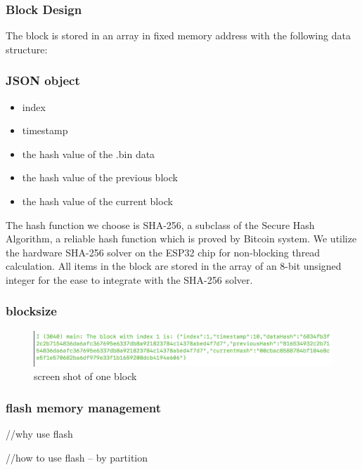 \documentclass{article}
\begin{document}
        \subsubsection{Block Design}
        The block is stored in an array in fixed memory address with the following data structure:

        \subsubsection{JSON object}

        \begin{itemize}
          \item index
          \item timestamp
          \item the hash value of the .bin data
          \item the hash value of the previous block
          \item the hash value of the current block
        \end{itemize}

        The hash function we choose is SHA-256, a subclass of the Secure Hash Algorithm, a reliable hash function which is proved by Bitcoin system. We utilize the hardware SHA-256 solver on the ESP32 chip for non-blocking thread calculation. All items in the block are stored in the array of an 8-bit unsigned integer for the ease to integrate with the SHA-256 solver.

        \subsubsection{blocksize}
        \begin{figure}[h!]
          \centering
          \includegraphics[scale=0.5]{lastest-block}
          \caption{screen shot of one block}
          \label{fig:lastest block}
        \end{figure}

      \subsubsection{flash memory management}
          //why use flash

          //how to use flash – by partition
\end{document}
